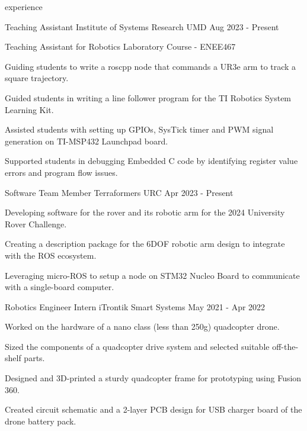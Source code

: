 \begin{section}{experience}

  \begin{work}
    {Teaching Assistant}
    {Institute of Systems Research}
    {UMD}
    {Aug 2023 - Present}

    \item Teaching Assistant for Robotics Laboratory Course - ENEE467
    \item Guiding students to write a roscpp node that commands a UR3e arm to track a square trajectory. 
    \item Guided students in writing a line follower program for the TI Robotics System Learning Kit.
    \item Assisted students with setting up GPIOs, SysTick timer and PWM signal generation on TI-MSP432 Launchpad board.
    \item Supported students in debugging Embedded C code by identifying register value errors and program flow issues.

  \end{work}

  \begin{work}
    {Software Team Member}
    {Terraformers URC}
    {}
    {Apr 2023 - Present}

    \item Developing software for the rover and its robotic arm for the 2024 University Rover Challenge.
    \item Creating a description package for the 6DOF robotic arm design to integrate with the ROS ecosystem.
    \item Leveraging micro-ROS to setup a node on STM32 Nucleo Board to communicate with a single-board computer.
  
  \end{work}

  \begin{work}
    {Robotics Engineer Intern}
    {iTrontik Smart Systems}
    {}
    {May 2021 - Apr 2022}

    \item Worked on the hardware of a nano class (less than 250g) quadcopter drone.
    \item Sized the components of a quadcopter drive system and selected suitable off-the-shelf parts.
    \item Designed and 3D-printed a sturdy quadcopter frame for prototyping using Fusion 360.
    \item Created circuit schematic and a 2-layer PCB design for USB charger board of the drone battery pack.
  
  \end{work}

\end{section}